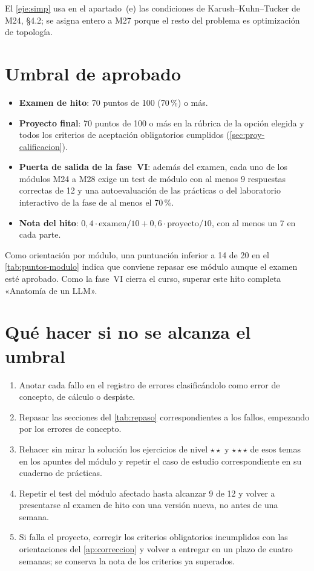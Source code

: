 El \cref{eje:simp} usa en el apartado~(e) las condiciones de Karush--Kuhn--Tucker de M24, §4.2; se asigna entero a M27 porque el resto del problema es optimización de topología.

\section{Umbral de aprobado}

\begin{itemize}[label=\textendash]
  \item \textbf{Examen de hito}: 70 puntos de 100 (70\,\%) o más.
  \item \textbf{Proyecto final}: 70 puntos de 100 o más en la rúbrica de la opción elegida y todos los criterios de aceptación obligatorios cumplidos (\cref{sec:proy-calificacion}).
  \item \textbf{Puerta de salida de la fase~VI}: además del examen, cada uno de los módulos M24 a M28 exige un test de módulo con al menos 9 respuestas correctas de 12 y una autoevaluación de las prácticas o del laboratorio interactivo de la fase de al menos el 70\,\%.
  \item \textbf{Nota del hito}: $0{,}4\cdot\text{examen}/10+0{,}6\cdot\text{proyecto}/10$, con al menos un 7 en cada parte.
\end{itemize}

Como orientación por módulo, una puntuación inferior a 14 de 20 en el \cref{tab:puntos-modulo} indica que conviene repasar ese módulo aunque el examen esté aprobado. Como la fase~VI cierra el curso, superar este hito completa «Anatomía de un LLM».

\section{Qué hacer si no se alcanza el umbral}

\begin{enumerate}[label=\arabic*.]
  \item Anotar cada fallo en el registro de errores clasificándolo como error de concepto, de cálculo o despiste.
  \item Repasar las secciones del \cref{tab:repaso} correspondientes a los fallos, empezando por los errores de concepto.
  \item Rehacer sin mirar la solución los ejercicios de nivel $\star\star$ y $\star\star\star$ de esos temas en los apuntes del módulo y repetir el caso de estudio correspondiente en su cuaderno de prácticas.
  \item Repetir el test del módulo afectado hasta alcanzar 9 de 12 y volver a presentarse al examen de hito con una versión nueva, no antes de una semana.
  \item Si falla el proyecto, corregir los criterios obligatorios incumplidos con las orientaciones del \cref{ap:correccion} y volver a entregar en un plazo de cuatro semanas; se conserva la nota de los criterios ya superados.
\end{enumerate}

